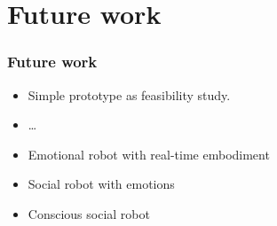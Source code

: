 \documentclass[12pt, aspectratio=169]{beamer}
\begin{document}
\section{Future work}

\begin{frame}
  \frametitle{Future work}
  
\begin{itemize}
  \item Simple prototype as feasibility study.
  \item \ldots\
  \item Emotional robot with real-time embodiment
  \item Social robot with emotions
  \item Conscious social robot
\end{itemize}

\end{frame}

\end{document}
